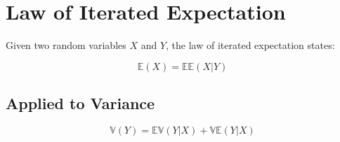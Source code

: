 \section{Law of Iterated Expectation}

Given two random variables $X$ and $Y$, the law of iterated expectation states:

\begin{equation}
\mathbb{E}(X) = \mathbb{E}\mathbb{E}(X|Y)
\end{equation}

\subsection{Applied to Variance}
\begin{equation}
\mathbb{V}(Y) = \mathbb{EV}(Y|X) + \mathbb{VE}(Y|X)
\end{equation}